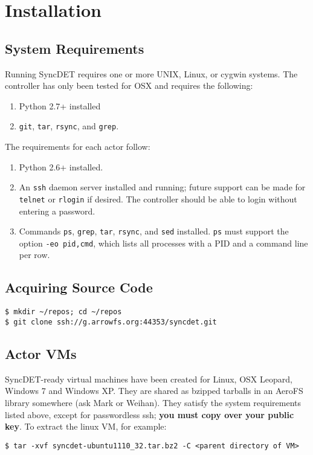 \section{Installation}

\subsection{System Requirements}

Running SyncDET requires one or more UNIX, Linux, or cygwin systems.
The controller has only been tested for OSX and requires the
following:
\begin{enumerate}
\item Python 2.7+ installed
\item {\tt git}, {\tt tar}, {\tt rsync}, and {\tt grep}.
\end{enumerate}
The requirements for each actor follow:
\begin{enumerate}
\item Python 2.6+ installed.
\item An {\tt ssh} daemon server installed and running; future support can be
made for {\tt telnet} or {\tt rlogin} if desired. The controller should be able
to login without entering a password.
\item Commands {\tt ps}, {\tt grep}, {\tt tar}, {\tt rsync}, and {\tt sed}
installed. {\tt ps} must support the option {\tt -eo pid,cmd}, which lists all
processes with a PID and a command line per row.
\end{enumerate}

\subsection{Acquiring Source Code}
\begin{verbatim}
$ mkdir ~/repos; cd ~/repos
$ git clone ssh://g.arrowfs.org:44353/syncdet.git
\end{verbatim}

\subsection{Actor VMs}
SyncDET-ready virtual machines have been created for Linux, OSX Leopard, Windows
7 and Windows XP. They are shared as bzipped tarballs in an AeroFS library
somewhere (ask Mark or Weihan). They satisfy the system requirements listed
above, except for passwordless ssh; {\bf you must copy over your public key}. To
extract the linux VM, for example:
\begin{verbatim}
$ tar -xvf syncdet-ubuntu1110_32.tar.bz2 -C <parent directory of VM>
\end{verbatim}

